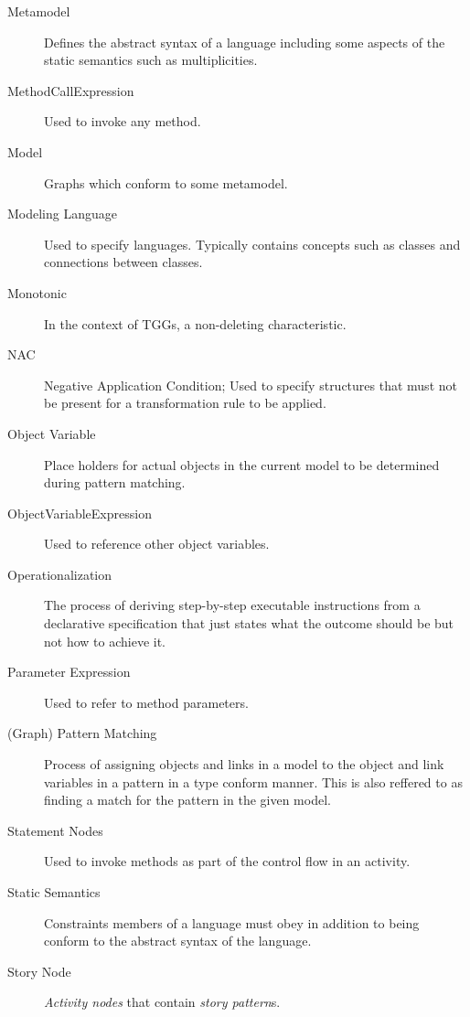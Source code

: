 \begin{description}
\item[Metamodel] 
Defines the abstract syntax of a language including some aspects of the static semantics such as multiplicities. 

\item[MethodCallExpression]
Used to invoke any method.

\item[Model] 
Graphs which conform to some metamodel.

\item[Modeling Language] 
Used to specify languages. Typically contains concepts such as classes and connections between classes.

\item[Monotonic] 
In the context of TGGs, a non-deleting characteristic.

\item[NAC]
Negative Application Condition; Used to specify structures that must not be present for a transformation rule to be applied.

\item[Object Variable]
Place holders for actual objects in the current model to be determined during pattern matching.

\item[ObjectVariableExpression]
Used to reference other object variables.

\item[Operationalization] 
The process of deriving step-by-step executable instructions from a declarative specification that just states what the outcome should
be but not how to achieve it.

\item[Parameter Expression]
Used to refer to method parameters.

\item[(Graph) Pattern Matching]
Process of assigning objects and links in a model to the object and link variables in a pattern in a type conform manner. This is also reffered to as finding a
match for the pattern in the given model.

\item[Statement Nodes]
Used to invoke methods as part of the control flow in an activity.

\item[Static Semantics] 
Constraints members of a language must obey in addition to being conform to the abstract syntax of the language.

\item[Story Node]
\emph{Activity nodes} that contain \emph{story pattern}s.


\end{description}
